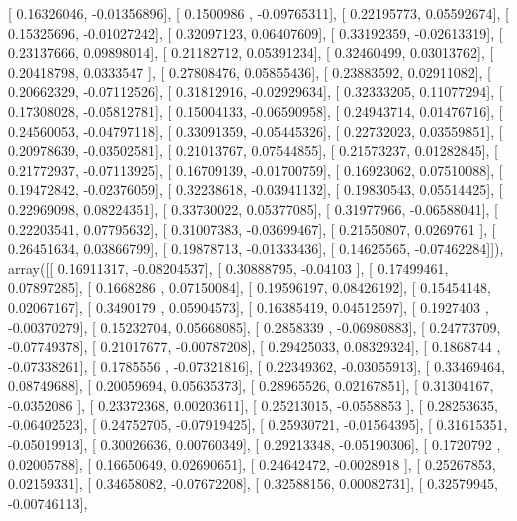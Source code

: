 \documentclass{article}
\begin{document}
       [ 0.16326046, -0.01356896],
       [ 0.1500986 , -0.09765311],
       [ 0.22195773,  0.05592674],
       [ 0.15325696, -0.01027242],
       [ 0.32097123,  0.06407609],
       [ 0.33192359, -0.02613319],
       [ 0.23137666,  0.09898014],
       [ 0.21182712,  0.05391234],
       [ 0.32460499,  0.03013762],
       [ 0.20418798,  0.0333547 ],
       [ 0.27808476,  0.05855436],
       [ 0.23883592,  0.02911082],
       [ 0.20662329, -0.07112526],
       [ 0.31812916, -0.02929634],
       [ 0.32333205,  0.11077294],
       [ 0.17308028, -0.05812781],
       [ 0.15004133, -0.06590958],
       [ 0.24943714,  0.01476716],
       [ 0.24560053, -0.04797118],
       [ 0.33091359, -0.05445326],
       [ 0.22732023,  0.03559851],
       [ 0.20978639, -0.03502581],
       [ 0.21013767,  0.07544855],
       [ 0.21573237,  0.01282845],
       [ 0.21772937, -0.07113925],
       [ 0.16709139, -0.01700759],
       [ 0.16923062,  0.07510088],
       [ 0.19472842, -0.02376059],
       [ 0.32238618, -0.03941132],
       [ 0.19830543,  0.05514425],
       [ 0.22969098,  0.08224351],
       [ 0.33730022,  0.05377085],
       [ 0.31977966, -0.06588041],
       [ 0.22203541,  0.07795632],
       [ 0.31007383, -0.03699467],
       [ 0.21550807,  0.0269761 ],
       [ 0.26451634,  0.03866799],
       [ 0.19878713, -0.01333436],
       [ 0.14625565, -0.07462284]]), array([[ 0.16911317, -0.08204537],
       [ 0.30888795, -0.04103   ],
       [ 0.17499461,  0.07897285],
       [ 0.1668286 ,  0.07150084],
       [ 0.19596197,  0.08426192],
       [ 0.15454148,  0.02067167],
       [ 0.3490179 ,  0.05904573],
       [ 0.16385419,  0.04512597],
       [ 0.1927403 , -0.00370279],
       [ 0.15232704,  0.05668085],
       [ 0.2858339 , -0.06980883],
       [ 0.24773709, -0.07749378],
       [ 0.21017677, -0.00787208],
       [ 0.29425033,  0.08329324],
       [ 0.1868744 , -0.07338261],
       [ 0.1785556 , -0.07321816],
       [ 0.22349362, -0.03055913],
       [ 0.33469464,  0.08749688],
       [ 0.20059694,  0.05635373],
       [ 0.28965526,  0.02167851],
       [ 0.31304167, -0.0352086 ],
       [ 0.23372368,  0.00203611],
       [ 0.25213015, -0.0558853 ],
       [ 0.28253635, -0.06402523],
       [ 0.24752705, -0.07919425],
       [ 0.25930721, -0.01564395],
       [ 0.31615351, -0.05019913],
       [ 0.30026636,  0.00760349],
       [ 0.29213348, -0.05190306],
       [ 0.1720792 ,  0.02005788],
       [ 0.16650649,  0.02690651],
       [ 0.24642472, -0.0028918 ],
       [ 0.25267853,  0.02159331],
       [ 0.34658082, -0.07672208],
       [ 0.32588156,  0.00082731],
       [ 0.32579945, -0.00746113],
\end{document}
